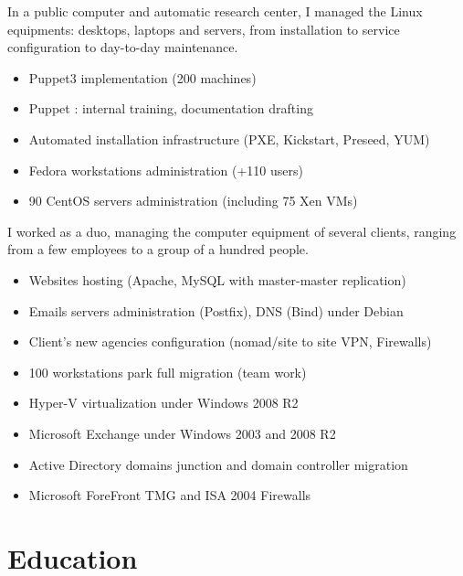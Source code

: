 \documentclass[12pt,a4paper,roman]{moderncv}          %
\begin{document}
{In a public computer and automatic research center, I managed the Linux equipments: desktops, laptops and servers, from installation to service configuration to day-to-day maintenance.
\begin{itemize}
  \item Puppet3 implementation (200 machines)
  \item Puppet : internal training, documentation drafting
  \item Automated installation infrastructure (PXE, Kickstart, Preseed, YUM)
  \item Fedora workstations administration (+110 users)
  \item 90 CentOS servers administration (including 75 Xen VMs)
\end{itemize}}

{I worked as a duo, managing the computer equipment of several clients, ranging from a few employees to a group of a hundred people.
\begin{itemize}
  \item Websites hosting (Apache, MySQL with master-master replication)
  \item Emails servers administration (Postfix), DNS (Bind) under Debian
  \item Client's new agencies configuration (nomad/site to site VPN, Firewalls)
  \item 100 workstations park full migration (team work)
  \item Hyper-V virtualization under Windows 2008 R2
  \item Microsoft Exchange under Windows 2003 and 2008 R2
  \item Active Directory domains junction and domain controller migration
  \item Microsoft ForeFront TMG and ISA 2004 Firewalls
\end{itemize}}


\section{Education}
\end{document}
